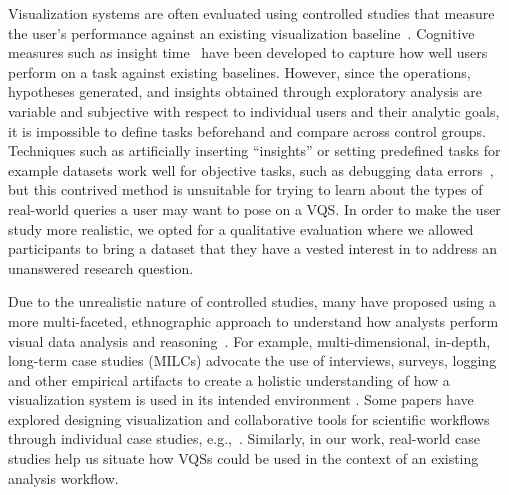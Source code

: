 \par Visualization systems are often evaluated using controlled studies that measure the user's performance against an existing visualization baseline~\cite{Plaisant2004}. Cognitive measures such as insight time~\cite{North2006,Yi2008} have been developed to capture how well users perform on a task against existing baselines. However, since the operations, hypotheses generated, and insights obtained through exploratory analysis are variable and subjective with respect to individual users and their analytic goals, it is impossible to define tasks beforehand and compare across control groups. Techniques such as artificially inserting ``insights'' or setting predefined tasks for example datasets work well for objective tasks, such as debugging data errors~\cite{kandel2011wrangler,Patel2010}, but this contrived method is unsuitable for trying to learn about the types of real-world queries a user may want to pose on a VQS. In order to make the user study more realistic, we opted for a qualitative evaluation where we allowed participants to bring a dataset that they have a vested interest in to address an unanswered research question.
\par Due to the unrealistic nature of controlled studies, many have proposed using a more multi-faceted, ethnographic approach to understand how analysts perform visual data analysis and reasoning~\cite{Plaisant2004,lam2012empirical,shneiderman2006strategies,munzner2009nested,Sedlmair2012}. For example, multi-dimensional, in-depth, long-term case studies (MILCs) advocate the use of interviews, surveys, logging and other empirical artifacts to create a holistic understanding of how a visualization system is used in its intended environment \cite{shneiderman2006strategies}. Some papers have explored designing visualization and collaborative tools for scientific workflows through individual case studies, e.g.,~\cite{Poon2008,Chen2016}. Similarly, in our work, real-world case studies help us situate how VQSs could be used in the context of an existing analysis workflow.  
